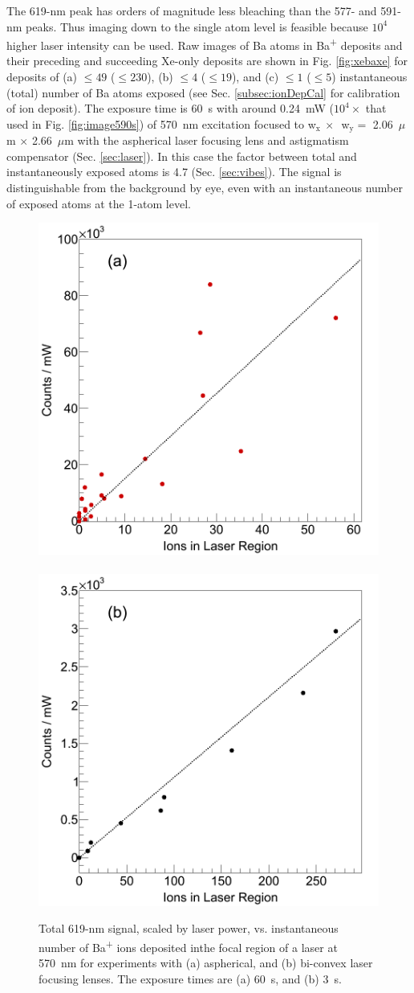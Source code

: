 The 619-nm peak has orders of magnitude less bleaching than the 577- and 591-nm peaks.  Thus imaging down to the single atom level is feasible because $10^4$ higher laser intensity can be used.  Raw images of Ba atoms in Ba\textsuperscript{+} deposits and their preceding and succeeding Xe-only deposits are shown in Fig. \ref{fig:xebaxe} for deposits of (a) $\leq 49$ ($\leq 230$), (b) $\leq 4$ ($\leq 19$), and (c) $\leq 1$ ($\leq 5$) instantaneous (total) number of Ba atoms exposed (see Sec. \ref{subsec:ionDepCal} for calibration of ion deposit).  The exposure time is 60~s with around 0.24~mW ($10^4 \times$ that used in Fig. \ref{fig:image590s}) of 570~nm excitation focused to w$_{\text{x}}~\times$~w$_{\text{y}} =$ 2.06~$\mu$m $\times$ 2.66~$\mu$m with the aspherical laser focusing lens and astigmatism compensator (Sec. \ref{sec:laser}).  In this case the factor between total and instantaneously exposed atoms is 4.7 (Sec. \ref{sec:vibes}).  The signal is distinguishable from the background by eye, even with an instantaneous number of exposed atoms at the 1-atom level.


\begin{figure} %
        \centering
                \includegraphics[width=.5\textwidth]{figures/lin_just20150807_lin.png}
                ~
                \includegraphics[width=.5\textwidth]{figures/lin_just20150526_lin.png}
                \caption{Total 619-nm signal, scaled by laser power, vs. instantaneous number of Ba\textsuperscript{+} ions deposited inthe focal region of a laser at 570~nm for experiments with (a) aspherical, and (b) bi-convex laser focusing lenses.  The exposure times are (a) 60~s, and (b) 3~s.}
\label{fig:lin}
\end{figure}

